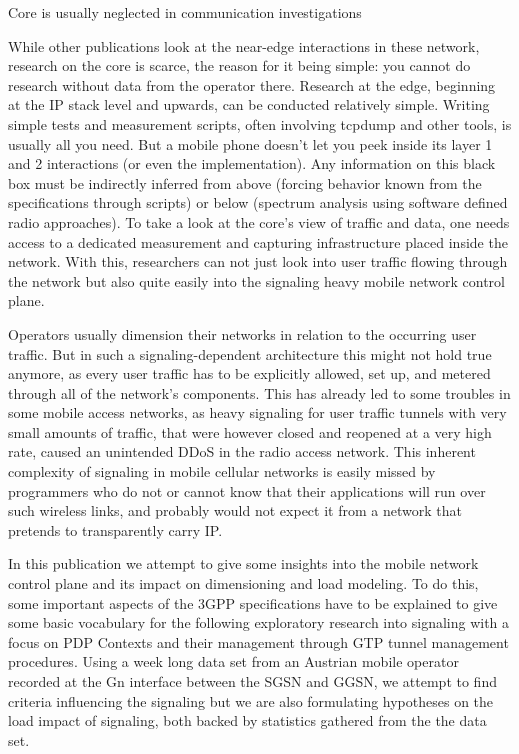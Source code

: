
Core is usually neglected in communication investigations


While other publications look at the near-edge interactions in these network, research on the core is scarce, the reason for it being simple: you cannot do research without data from the operator there. Research at the edge, beginning at the IP stack level and upwards, can be conducted relatively simple. Writing simple tests and measurement scripts, often involving tcpdump and other tools, is usually all you need. But a mobile phone doesn't let you peek inside its layer 1 and 2 interactions (or even the implementation). Any information on this black box must be indirectly inferred from above (forcing behavior known from the specifications through scripts) or below (spectrum analysis using software defined radio approaches). To take a look at the core's view of traffic and data, one needs access to a dedicated measurement and capturing infrastructure placed inside the network. With this, researchers can not just look into user traffic flowing through the network but also quite easily into the signaling heavy mobile network control plane. 

Operators usually dimension their networks in relation to the occurring user traffic. But in such a signaling-dependent architecture this might not hold true anymore, as every user traffic has to be explicitly allowed, set up, and metered through all of the network's components. This has already led to some troubles in some mobile access networks, as heavy signaling for user traffic tunnels with very small amounts of traffic, that were however closed and reopened at a very high rate, caused an unintended \gls{DDoS} in the radio access network\cite{lt2012docostorm, it2011birdandroid}. 
This inherent complexity of signaling in mobile cellular networks is easily missed by programmers who do not or cannot know that their applications will run over such wireless links, and probably would not expect it from a network that pretends to transparently carry IP.

In this publication we attempt to give some insights into the mobile network control plane and its impact on dimensioning and load modeling. To do this, some important aspects of the \gls{3GPP} specifications have to be explained to give some basic vocabulary for the following exploratory research into signaling with a focus on \gls{PDP} Contexts and their management through \gls{GTP} tunnel management procedures. Using a week long data set from an Austrian mobile operator recorded at the Gn interface between the \gls{SGSN} and \gls{GGSN}, we attempt to find criteria influencing the signaling but we are also formulating hypotheses on the load impact of signaling, both backed by statistics gathered from the the data set.\\



